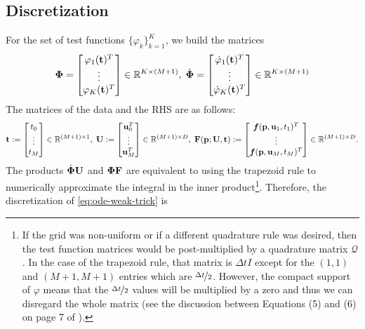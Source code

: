 \subsection{Discretization}
For the set of test functions $\{\varphi_k\}_{k=1}^K$, we build the matrices 
\[
    \boldsymbol{\Phi} = \begin{bmatrix}
        \varphi_1(\mathbf{t})^T \\ \vdots \\ \varphi_K(\mathbf{t})^T
    \end{bmatrix}\in \mathbb{R}^{K\times (M+1)}, \;
    \dot{\boldsymbol{\Phi}} = \begin{bmatrix}
		\dot{\varphi}_1(\mathbf{t})^T \\ \vdots \\ \dot{\varphi}_K(\mathbf{t})^T
    \end{bmatrix}\in \mathbb{R}^{K\times (M+1)} \\
\]
The matrices of the data and the RHS are as follows:
\begin{equation*}
	\mathbf{t} := \begin{bmatrix}
		t_0 \\ \vdots \\ t_M
	\end{bmatrix}\in \mathbb{R}^{(M+1)\times 1}, \;
	\mathbf{U} := \begin{bmatrix}
		\mathbf{u}_0 ^T\\
		\vdots \\
		\mathbf{u}_M^T
	\end{bmatrix}\in\mathbb{R}^{(M+1) \times D}, \;
	\mathbf{F}(\mathbf{p};\mathbf{U},\mathbf{t}) := \begin{bmatrix}
		\boldsymbol{f}(\mathbf{p}, \mathbf{u}_1,t_1)^T \\
		\vdots \\
		\boldsymbol{f}(\mathbf{p}, \mathbf{u}_M,t_M)^T 
	\end{bmatrix}\in\mathbb{R}^{(M+1) \times D}.
\end{equation*}
The products $\dot{\boldsymbol{\Phi}}\mathbf{U}$ and $\boldsymbol{\Phi}\mathbf{F}$ are equivalent to using the trapezoid rule to numerically approximate the integral in the inner product\footnote{If the grid was non-uniform or if a different quadrature rule was desired, then the test function matrices would be post-multiplied by a quadrature matrix $\mathcal{Q}$.  In the case of the trapezoid rule, that matrix is $\Delta t I$ except for the $(1,1)$ and $(M+1,M+1)$ entries which are $\nicefrac{\Delta t}{2}$. However, the compact support of $\varphi$ means that the $\nicefrac{\Delta t}{2}$ values will be multiplied by a zero and thus we can disregard the whole matrix (see the discussion between Equations (5) and (6) on page 7 of \citep{BortzMessengerDukic2023BullMathBiol}).}. Therefore, the discretization of \eqref{eq:ode-weak-trick} is
